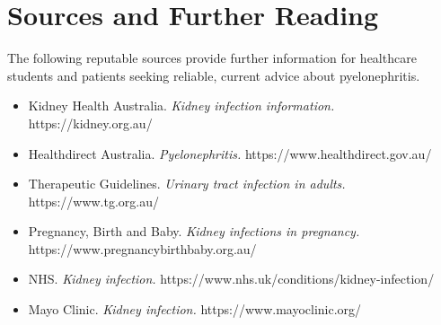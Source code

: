\section*{Sources and Further Reading}
The following reputable sources provide further information for healthcare students and patients seeking reliable, current advice about pyelonephritis.
\begin{itemize}
    \item Kidney Health Australia. \textit{Kidney infection information.} https://kidney.org.au/
    \item Healthdirect Australia. \textit{Pyelonephritis.} https://www.healthdirect.gov.au/
    \item Therapeutic Guidelines. \textit{Urinary tract infection in adults.} https://www.tg.org.au/
    \item Pregnancy, Birth and Baby. \textit{Kidney infections in pregnancy.} https://www.pregnancybirthbaby.org.au/
    \item NHS. \textit{Kidney infection.} https://www.nhs.uk/conditions/kidney-infection/
    \item Mayo Clinic. \textit{Kidney infection.} https://www.mayoclinic.org/
\end{itemize}
